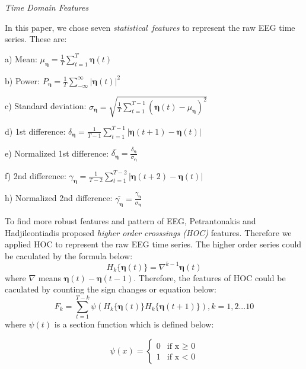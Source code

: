 \documentclass[runningheads,a4paper]{llncs}
\begin{document}
\emph{Time Domain Features}

In this paper, we chose seven \emph{statistical\ features} to represent the
raw EEG time series. These are:

a) Mean: ${\mu}_{\bm{\eta}} = \frac{1}{T}\sum_{t=1}^T \bm{\eta}(t)$

b) Power: $P_{\bm{\eta}} = \frac{1}{T}\sum_{-\infty}^{\infty} |{\bm{\eta}}(t)|^2 $

c) Standard deviation: $\sigma_{\bm{\eta}} = \sqrt{ \frac{1}{T} \sum_{t=1}^{T-1} ({\bm{\eta}}(t) - {\mu}_{\bm{\eta}})^2 }$

d) 1st difference: $\delta_{\bm{\eta}} = \frac{1}{T-1}\sum_{t=1}^{T-1}|{\bm{\eta}}(t+1) - {\bm{\eta}}(t)|$

e) Normalized 1st difference: $ \bar{\delta_{\bm{\eta}}} = \frac{ \delta_{\bm{\eta}}}{\sigma_{\bm{\eta}}}$

f) 2nd difference: $\gamma_{\bm{\eta}} = \frac{1}{T-2}\sum_{t=1}^{T-2}|{\bm{\eta}}(t+2) - {\bm{\eta}}(t)|$

h) Normalized 2nd difference: $\bar{\gamma_{\bm{\eta}}} = \frac{\gamma_{\bm{\eta}}}{\sigma_{\bm{\eta}}}$

To find more robust features and pattern of EEG, Petrantonakis and Hadjileontiadis proposed
 \emph{higher order crosssings (HOC)} features\cite{HOC}. Therefore we applied HOC to represent the raw EEG time series.
The higher order series could be caculated by the formula below:
\begin{equation}
    H_k\{{\bm{\eta}}(t)\} = \nabla^{k-1}{\bm{\eta}}(t)
\end{equation}
where $\nabla$ means ${\bm{\eta}}(t) - {\bm{\eta}}(t-1)$. Therefore, the features
of HOC could be caculated by counting the sign changes or equation below:
\begin{equation}
  F_k = \sum_{t=1}^{T-k}\psi(H_k\{{\bm{\eta}}(t)\}H_k\{{\bm{\eta}}(t+1)\}), k = 1,2...10
\end{equation}
where $\psi(t)$ is a section function which is defined below:

\begin{equation}
   \psi(x)=
   \begin{cases}
   0 &\mbox{if x $\geq$ 0}\\
   1 &\mbox{if  x $<$ 0}
   \end{cases}
\end{equation}
\end{document}
